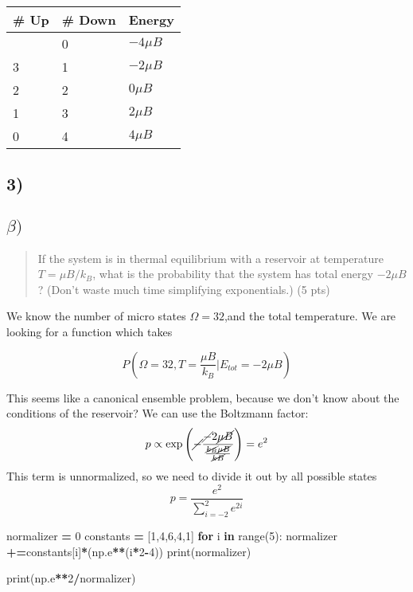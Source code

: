 \documentclass[]{article}
\newenvironment{Shaded}{\begin{snugshade}}{\end{snugshade}}
\newcommand{\BuiltInTok}[1]{#1}
\newcommand{\ControlFlowTok}[1]{\textcolor[rgb]{0.13,0.29,0.53}{\textbf{#1}}}
\newcommand{\DecValTok}[1]{\textcolor[rgb]{0.00,0.00,0.81}{#1}}
\newcommand{\KeywordTok}[1]{\textcolor[rgb]{0.13,0.29,0.53}{\textbf{#1}}}
\newcommand{\NormalTok}[1]{#1}
\newcommand{\OperatorTok}[1]{\textcolor[rgb]{0.81,0.36,0.00}{\textbf{#1}}}
\begin{document}
\begin{longtable}[]{@{}lll@{}}
\toprule\noalign{}
\# Up & \# Down & Energy \\
\midrule\noalign{}
\endhead
\bottomrule\noalign{}
\endlastfoot
4 & 0 & \(-4\mu B\) \\
3 & 1 & \(-2\mu B\) \\
2 & 2 & \(0\mu B\) \\
1 & 3 & \(2\mu B\) \\
0 & 4 & \(4\mu B\) \\
\end{longtable}

\hypertarget{section-2}{%
\subsection{3)}\label{section-2}}

\hypertarget{beta}{%
\subsection{\texorpdfstring{\(\beta)\)}{\textbackslash beta)}}\label{beta}}

\begin{quote}
If the system is in thermal equilibrium with a reservoir at temperature
\(T = \mu B / k_B\), what is the probability that the system has total
energy \(-2\mu B\)? (Don't waste much time simplifying exponentials.) (5
pts)
\end{quote}

We know the number of micro states \(\Omega = 32\),and the total
temperature. We are looking for a function which takes

\[
P\left( \Omega=32,T = \frac{\mu B}{k_{B}} \bigg| E_{tot} = -2\mu B \right)
\]

This seems like a canonical ensemble problem, because we don't know
about the conditions of the reservoir? We can use the Boltzmann factor:
\[
p \propto \exp\left( \cancel{ - }\frac{\cancel{ - }2\cancel{ \mu B }}{\frac{\cancel{ k_{B} }\cancel{ \mu B }}{\cancel{ kB }}} \right) = e^{ 2 } 
\] This term is unnormalized, so we need to divide it out by all
possible states \[
p = \frac{e^{2}}{\sum_{i=-2}^{2}e^{ 2i }}
\]

\begin{Shaded}
\begin{Highlighting}[]
\NormalTok{normalizer }\OperatorTok{=} \DecValTok{0}
\NormalTok{constants }\OperatorTok{=}\NormalTok{ [}\DecValTok{1}\NormalTok{,}\DecValTok{4}\NormalTok{,}\DecValTok{6}\NormalTok{,}\DecValTok{4}\NormalTok{,}\DecValTok{1}\NormalTok{]}
\ControlFlowTok{for}\NormalTok{ i }\KeywordTok{in} \BuiltInTok{range}\NormalTok{(}\DecValTok{5}\NormalTok{):}
\NormalTok{    normalizer }\OperatorTok{+=}\NormalTok{constants[i]}\OperatorTok{*}\NormalTok{(np.e}\OperatorTok{**}\NormalTok{(i}\OperatorTok{*}\DecValTok{2}\OperatorTok{{-}}\DecValTok{4}\NormalTok{))}
\BuiltInTok{print}\NormalTok{(normalizer)}

\BuiltInTok{print}\NormalTok{(np.e}\OperatorTok{**}\DecValTok{2}\OperatorTok{/}\NormalTok{normalizer)}
\end{Highlighting}
\end{Shaded}
\end{document}

